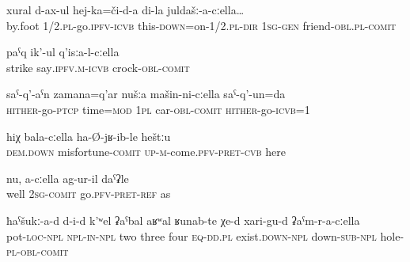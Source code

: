 \begin{exe}
	\ex	\label{ex:we (were) going by foot there with my friends} 
	\gll	xural	d-ax-ul	hej-ka=či-d-a	di-la	juldašː-a-cːella\ldots\\
		by.foot 1/2.\textsc{pl}-go.\textsc{ipfv}-\textsc{icvb} this-\textsc{down}=on-1/2.\textsc{pl}-\textsc{dir} 1\textsc{sg}-\textsc{gen} friend-\textsc{obl}.\textsc{pl}-\textsc{comit}\\
	\glt	{}
	
	\ex	\label{ex:striking with the crock}
	\gll	paˁq ik'-ul q'isːa-l-cːella\\
		strike say\textsc{.ipfv.m-icvb} crock-\textsc{obl-comit}\\
	\glt	{}
	
	\ex	\label{ex:When we go back, we go by car}
	\gll	saˁ-q'-aˁn	zamana=q'ar	nušːa	mašin-ni-cːella	saˁ-q'-un=da \\
		\textsc{hither}-go-\textsc{ptcp}	time=\textsc{mod}	1\textsc{pl}	car-\textsc{obl}-\textsc{comit}	\textsc{hither}-go-\textsc{icvb}=1\\
	\glt	{}
	
	\ex	\label{ex:when he came here with sorrow}
	\gll	hiχ	bala-cːella	ha-Ø-jʁ-ib-le	heštːu\\
		\textsc{dem.down}	misfortune-\textsc{comit}	\textsc{up}-\textsc{m}-come.\textsc{pfv}-\textsc{pret}-\textsc{cvb}	here\\
	\glt	{}
	
	\ex	\label{ex:as if it happened with you}
	\gll	nu,	a-cːella	ag-ur-il	daˁʡle \\
		well	2\textsc{sg}-\textsc{comit}	go.\textsc{pfv}-\textsc{pret}-\textsc{ref} as\\
	\glt	{}
		
	\ex	\label{ex:Inside the pot there are 2, 3, 4, things like this with holes on the lower side}
	\gll	ħaˁšukː-a-d	d-i-d	k'ʷel	ʡaˁbal	aʁʷal	ʁunab-te	χe-d	xari-gu-d	ʡaˁm-r-a-cːella\\
		pot-\textsc{loc}-\textsc{npl}	\textsc{npl-in}-\textsc{npl} two	three	four	\textsc{eq}-\textsc{dd.pl} 	exist.\textsc{down-npl}	down-\textsc{sub}-\textsc{npl	} hole-\textsc{pl}-\textsc{obl}-\textsc{comit}\\
	\glt	{}
\end{exe}


